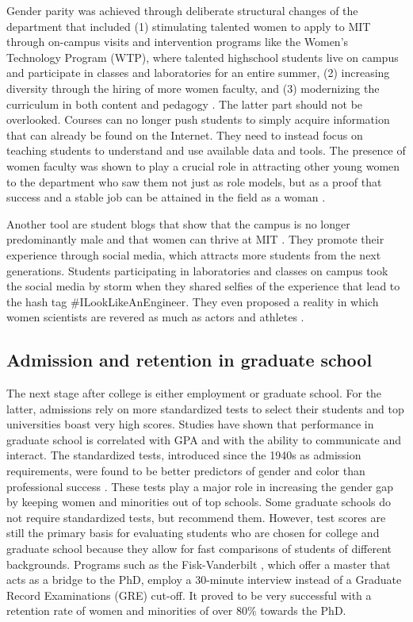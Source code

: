 \documentclass[utf8]{frontiersSCNS} %
\begin{document}
Gender parity was achieved through deliberate structural changes of the department that included (1) stimulating talented women to apply to MIT through on-campus visits and intervention programs like the Women's Technology Program (WTP), where talented highschool students live on campus and participate in classes and laboratories for an entire summer, (2) increasing diversity through the hiring of more women faculty, and (3) modernizing the curriculum in both content and pedagogy \citep{GenderDiversityMIT, xugetting}. The latter part should not be overlooked. Courses can no longer push students to simply acquire information that can already be found on the Internet. They need to instead focus on teaching students to understand and use available data and tools. The presence of women faculty was shown to play a crucial role in attracting other young women to the department who saw them not just as role models, but as a proof that success and a stable job can be attained in the field as a woman \citep{xugetting}. 

Another tool are student blogs that show that the campus is no longer predominantly male and that women can thrive at MIT \citep{xugetting}. They promote their experience through social media, which attracts more students from the next generations. Students participating in laboratories and classes on campus took the social media by storm when they shared selfies of the experience that lead to the hash tag \#ILookLikeAnEngineer.  They even proposed a reality in which women scientists are revered as much as actors and athletes \citep{GenderDiversityMIT}. 

\subsection{Admission and retention in graduate school}
\label{6.2}
The next stage after college is either employment or graduate school. For the latter, admissions rely on more standardized tests to select their students and top universities boast very high scores. Studies have shown that performance in graduate school is correlated with GPA and with the ability to communicate and interact. The standardized tests, introduced since the 1940s as admission requirements, were found to be better predictors of gender and color than professional success \citep{ripin1996fighting,miller2014test,miller2019typical}. These tests play a major role in increasing the gender gap by keeping women and minorities out of top schools. Some graduate schools do not require standardized tests, but recommend them. However, test scores are still the primary basis for evaluating students who are chosen for college and graduate school because they allow for fast comparisons of students of different backgrounds. Programs such as the Fisk-Vanderbilt \citep{miller2014test}, which offer a master that acts as a bridge to the PhD, employ a 30-minute interview instead of a Graduate Record Examinations (GRE) cut-off. It proved to be very successful with a  retention rate of women and minorities of over 80\% towards the PhD. 
\end{document}
